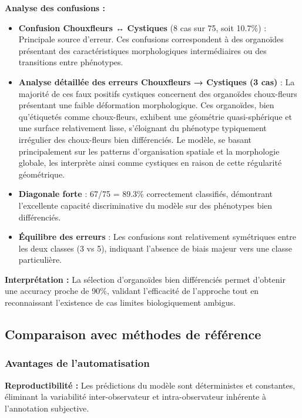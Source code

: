 \textbf{Analyse des confusions :}
\begin{itemize}
    \item \textbf{Confusion Chouxfleurs ↔ Cystiques} (8 cas sur 75, soit 10.7\%) : Principale source d'erreur. Ces confusions correspondent à des organoïdes présentant des caractéristiques morphologiques intermédiaires ou des transitions entre phénotypes.
    
    \item \textbf{Analyse détaillée des erreurs Chouxfleurs → Cystiques (3 cas)} : La majorité de ces faux positifs cystiques concernent des organoïdes choux-fleurs présentant une faible déformation morphologique. Ces organoïdes, bien qu'étiquetés comme choux-fleurs, exhibent une géométrie quasi-sphérique et une surface relativement lisse, s'éloignant du phénotype typiquement irrégulier des choux-fleurs bien différenciés. Le modèle, se basant principalement sur les patterns d'organisation spatiale et la morphologie globale, les interprète ainsi comme cystiques en raison de cette régularité géométrique.
    
    \item \textbf{Diagonale forte} : 67/75 = 89.3\% correctement classifiés, démontrant l'excellente capacité discriminative du modèle sur des phénotypes bien différenciés.
    
    \item \textbf{Équilibre des erreurs} : Les confusions sont relativement symétriques entre les deux classes (3 vs 5), indiquant l'absence de biais majeur vers une classe particulière.
\end{itemize}

\textbf{Interprétation :}
La sélection d'organoïdes bien différenciés permet d'obtenir une accuracy proche de 90\%, validant l'efficacité de l'approche tout en reconnaissant l'existence de cas limites biologiquement ambigus.

\subsection{Comparaison avec méthodes de référence}

\subsubsection{Avantages de l'automatisation}

\textbf{Reproductibilité :}
Les prédictions du modèle sont déterministes et constantes, éliminant la variabilité inter-observateur et intra-observateur inhérente à l'annotation subjective.

